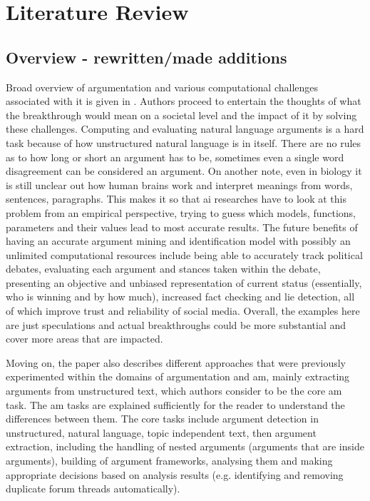 \section{Literature Review}
    \subsection{Overview - rewritten/made additions}
        Broad overview of argumentation and various computational challenges associated with it is given in \autocite{Lippi2016ArgumentationMS}. Authors proceed to entertain the thoughts of what the breakthrough would mean on a societal level and the impact of it by solving these challenges. Computing and evaluating natural language arguments is a hard task because of how unstructured natural language is in itself. There are no rules as to how long or short an argument has to be, sometimes even a single word disagreement can be considered an argument. On another note, even in biology it is still unclear out how human brains work and interpret meanings from words, sentences, paragraphs. This makes it so that \gls{ai} researches have to look at this problem from an empirical perspective, trying to guess which models, functions, parameters and their values lead to most accurate results. The future benefits of having an accurate argument mining and identification model with possibly an unlimited computational resources include being able to accurately track political debates, evaluating each argument and stances taken within the debate, presenting an objective and unbiased representation of current status (essentially, who is winning and by how much), increased fact checking and lie detection, all of which improve trust and reliability of social media. Overall, the examples here are just speculations and actual breakthroughs could be more substantial and cover more areas that are impacted.
        
        Moving on, the paper also describes different approaches that were previously experimented within the domains of argumentation and \gls{am}, mainly extracting arguments from unstructured text, which authors consider to be the core \gls{am} task. The \gls{am} tasks are explained sufficiently for the reader to understand the differences between them. The core tasks include argument detection in unstructured, natural language, topic independent text, then argument extraction, including the handling of nested arguments (arguments that are inside arguments), building of argument frameworks, analysing them and making appropriate decisions based on analysis results (e.g. identifying and removing duplicate forum threads automatically). 
        
